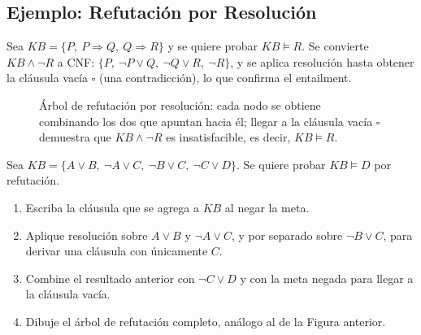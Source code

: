 \subsection{Ejemplo: Refutación por Resolución}

\begin{example}[Refutación]
    Sea $KB = \{P,\ P \Rightarrow Q,\ Q \Rightarrow R\}$ y se quiere probar $KB \models R$. Se convierte $KB \land \neg R$
    a CNF: $\{P,\ \neg P \lor Q,\ \neg Q \lor R,\ \neg R\}$, y se aplica resolución hasta obtener la cláusula vacía
    $\square$ (una contradicción), lo que confirma el entailment.
\end{example}

\begin{figure}[H]
\centering
{}
\caption{Árbol de refutación por resolución: cada nodo se obtiene combinando los dos que apuntan hacia él; llegar a la
cláusula vacía $\square$ demuestra que $KB \land \neg R$ es insatisfacible, es decir, $KB \models R$.}
\end{figure}

\begin{exercise}
    Sea $KB = \{A \lor B,\ \neg A \lor C,\ \neg B \lor C,\ \neg C \lor D\}$. Se quiere probar $KB \models D$ por
    refutación.
    \begin{enumerate}
        \item Escriba la cláusula que se agrega a $KB$ al negar la meta.
        \item Aplique resolución sobre $A \lor B$ y $\neg A \lor C$, y por separado sobre $\neg B \lor C$, para derivar
        una cláusula con únicamente $C$.
        \item Combine el resultado anterior con $\neg C \lor D$ y con la meta negada para llegar a la cláusula vacía.
        \item Dibuje el árbol de refutación completo, análogo al de la Figura anterior.
    \end{enumerate}
\end{exercise}

